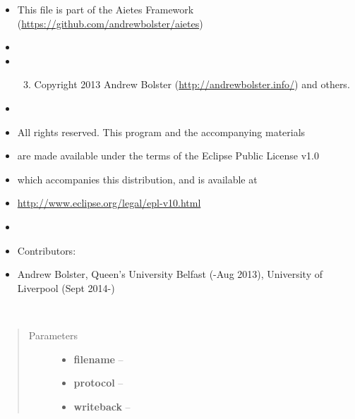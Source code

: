 \documentclass[letterpaper,10pt,english]{sphinxmanual}
\begin{document}
\label{index:module-aietes.Tools}\begin{itemize}
\item {} 
This file is part of the Aietes Framework (\href{https://github.com/andrewbolster/aietes}{https://github.com/andrewbolster/aietes})

\item {} 
\item {} \begin{enumerate}
\setcounter{enumi}{2}
\item {} 
Copyright 2013 Andrew Bolster (\href{http://andrewbolster.info/}{http://andrewbolster.info/}) and others.

\end{enumerate}

\item {} 
\item {} 
All rights reserved. This program and the accompanying materials

\item {} 
are made available under the terms of the Eclipse Public License v1.0

\item {} 
which accompanies this distribution, and is available at

\item {} 
\href{http://www.eclipse.org/legal/epl-v10.html}{http://www.eclipse.org/legal/epl-v10.html}

\item {} 
\item {} 
Contributors:

\item {} 
Andrew Bolster, Queen's University Belfast (-Aug 2013), University of Liverpool (Sept 2014-)

\end{itemize}

\begin{fulllineitems}
\label{index:aietes.Tools.AutoSyncShelf}~\begin{quote}\begin{description}
\item[{Parameters}] \leavevmode\begin{itemize}
\item {} 
\textbf{filename} -- 

\item {} 
\textbf{protocol} -- 

\item {} 
\textbf{writeback} -- 

\end{itemize}

\end{description}\end{quote}

\end{fulllineitems}
\end{document}
